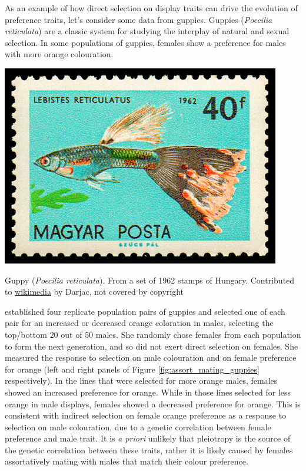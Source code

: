 As an example of how direct selection on display traits can drive the
evolution of preference traits, let's consider some data from
guppies. Guppies ({\it Poecilia reticulata}) are a classic system for
studying the interplay of natural and sexual selection. In some populations of
guppies, females show a preference for males with more orange colouration.\begin{marginfigure}
\begin{center}
\includegraphics[width=\textwidth]{illustration_images/Quant_gen/Guppies/1439_fish_40.png}  %
\end{center} \label{fig:guppies}
\caption{Guppy ({\it Poecilia reticulata}). \newline \noindent \tiny{From a set of 1962 stamps
  of Hungary. Contributed to \href{https://commons.wikimedia.org/wiki/File:1439_fish_40.png}{wikimedia} by Darjac, not covered by copyright}}
\end{marginfigure} 
 \citet{houde:94} established four replicate
population pairs of guppies and selected one of each pair for an increased or decreased orange coloration in males, selecting the top/bottom $20$ out of $50$
males. She randomly chose females from each population to form the next generation, and so did not
exert direct selection on females. She measured the response to 
selection on male colouration and on female preference for orange (left
and right panels of Figure \ref{fig:assort_mating_guppies}
respectively). In the lines that were selected for more orange males,
females showed an increased preference for orange. While in those
lines selected for less orange in male displays, females
showed a decreased preference for orange. This is consistent with indirect selection on female orange preference as a response to
selection on male colouration, due to a genetic correlation between
female preference and male trait. It is {\it a priori} unlikely
that pleiotropy is the source of the genetic correlation between these
traits, rather it is likely caused by females assortatively mating with
males that match their colour preference. 


